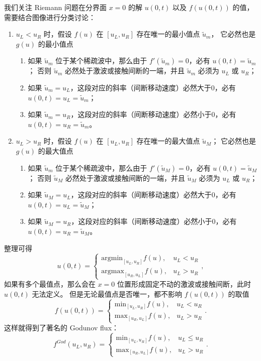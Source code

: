 我们关注 Riemann 问题在分界面 $x=0$ 的解 $u(0,t)$ 以及 $f(u(0,t))$ 的值，需要结合图像进行分类讨论：
\begin{enumerate}
    \item $u_L < u_R$ 时，假设 $f(u)$ 在 $[u_L,u_R]$ 存在唯一的最小值点 $\widetilde{u}_m$，
          它必然也是 $g(u)$ 的最小值点
          \begin{enumerate}
              \item 如果 $\widetilde{u}_m$ 位于某个稀疏波中，那么由于 $f'(\widetilde{u}_m) = 0$，必有 $u(0,t) = \widetilde{u}_m$；
                    否则 $\widetilde{u}_m$ 必然处于激波或接触间断的一端，并且 $\widetilde{u}_m$ 必须为 $u_L$ 或 $u_R$；
              \item 如果 $\widetilde{u}_m = u_L$，这段对应的斜率（间断移动速度）必然大于0，必有 $u(0,t) = u_L = \widetilde{u}_m$；
              \item 如果 $\widetilde{u}_m = u_R$，这段对应的斜率（间断移动速度）必然小于0，必有 $u(0,t) = u_R = \widetilde{u}_m$。
          \end{enumerate}
    \item $u_L > u_R$ 时，假设 $f(u)$ 在 $[u_L,u_R]$ 存在唯一的最大值点 $\widetilde{u}_M$；
          它必然也是 $g(u)$ 的最大值点
          \begin{enumerate}
              \item 如果 $\widetilde{u}_m$ 位于某个稀疏波中，那么由于 $f'(\widetilde{u}_M) = 0$，必有 $u(0,t) = \widetilde{u}_M$；
                    否则 $\widetilde{u}_M$ 必然处于激波或接触间断的一端，并且 $\widetilde{u}_M$ 必须为 $u_L$ 或 $u_R$；
              \item 如果 $\widetilde{u}_M = u_L$，这段对应的斜率（间断移动速度）必然大于0，必有 $u(0,t) = u_L = \widetilde{u}_M$；
              \item 如果 $\widetilde{u}_M = u_R$，这段对应的斜率（间断移动速度）必然小于0，必有 $u(0,t) = u_R = \widetilde{u}_M$。
          \end{enumerate}
\end{enumerate}
整理可得
\[
    u(0,t) =
    \begin{cases}
        \text{argmin}_{[u_L,u_R]} f(u), & u_L < u_R \\
        \text{argmax}_{[u_R,u_L]} f(u), & u_L > u_R
    \end{cases},
\]
如果有多个最值点，那么会在 $x=0$ 位置形成固定不动的激波或接触间断，此时 $u(0,t)$ 无法定义。
但是无论最值点是否唯一，都不影响 $f(u(0,t))$ 的取值
\[
    f(u(0,t)) =
    \begin{cases}
        \text{min}_{[u_L,u_R]} f(u), & u_L < u_R \\
        \text{max}_{[u_R,u_L]} f(u), & u_L > u_R
    \end{cases}.
\]
这样就得到了著名的 Godunov flux：
\[
    f^{God}(u_L,u_R) =
    \begin{cases}
        \text{min}_{[u_L,u_R]} f(u), & u_L \le u_R \\
        \text{max}_{[u_R,u_L]} f(u), & u_L > u_R
    \end{cases}.
\]

